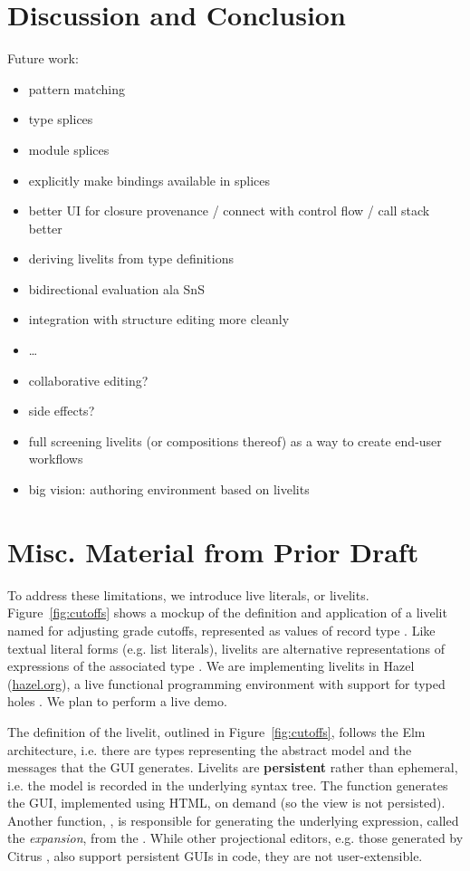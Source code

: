 \section{Discussion and Conclusion}
Future work:
\begin{itemize}
  \item pattern matching
  \item type splices
  \item module splices
  \item explicitly make bindings available in splices
  \item better UI for closure provenance / connect with control flow / call stack better
  \item deriving livelits from type definitions
  \item bidirectional evaluation ala SnS
  \item integration with structure editing more cleanly
  \item \dots
  \item collaborative editing?
  \item side effects?
  \item full screening livelits (or compositions thereof) as a way to create end-user workflows
  \item big vision: authoring environment based on livelits
\end{itemize}
\clearpage
\appendix
\section{Misc. Material from Prior Draft}

To address these limitations, we introduce live literals, or livelits. Figure~\ref{fig:cutoffs} shows a mockup of the definition and application of a livelit named  for adjusting grade cutoffs, represented as values of  record type . Like textual literal forms (e.g. list literals), livelits are alternative representations of expressions of the associated type \cite{DBLP:journals/pacmpl/OmarA18}. %
We are implementing livelits in Hazel (\url{hazel.org}), a live functional programming environment with support for typed holes \cite{popl-paper}. We plan to perform a live demo.




The definition of
the livelit, outlined in Figure~\ref{fig:cutoffs}, follows the Elm architecture,
i.e. there are types representing the abstract model and the messages that the 
GUI generates. Livelits are \textbf{persistent} rather than ephemeral, i.e. the model is recorded in the underlying syntax tree. The  function generates the GUI, implemented using HTML, on demand (so the view is not persisted). Another function, , is responsible for generating the underlying expression, called the \emph{expansion}, from the . 
While other projectional editors, e.g. those generated by Citrus \cite{DBLP:conf/uist/KoM05}, also support persistent GUIs in code, they are not user-extensible. 

